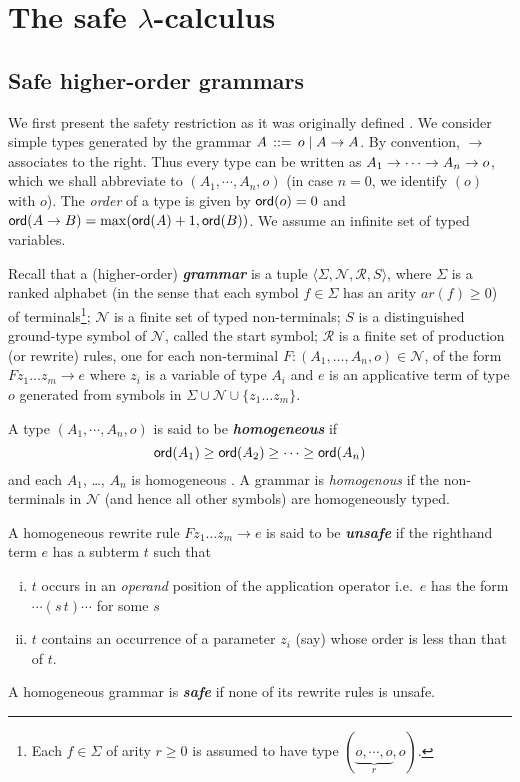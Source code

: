 \documentclass{llncs}
\newcommand\defname[1]{{\bf\em #1}\index{#1}}
\newcommand\union{\cup}
\begin{document}
\section{The safe $\lambda$-calculus}

\subsection{Safe higher-order grammars}
We first present the safety restriction as it was originally defined
\cite{KNU02}. We consider simple types generated by the grammar $A \,
::= \, o \; | \; A \rightarrow A$. By convention, $\rightarrow$ associates
to the right. Thus every type can be written as $A_1 \rightarrow \cdots
\rightarrow A_n \rightarrow o$, which we shall abbreviate to $(A_1, \cdots,
A_n, o)$ (in case $n = 0$, we identify $(o)$ with $o$). The
\emph{order} of a type is given by ${\sf ord}(o) = 0$ and ${\sf ord}(A \rightarrow
  B) = \max({\sf ord}(A)+1, {\sf ord}(B))$. We assume an infinite set of typed
variables.

Recall that a (higher-order) \defname{grammar} is a tuple $\langle
\Sigma, \mathcal{N}, \mathcal{R}, S \rangle$, where $\Sigma$ is a
ranked alphabet (in the sense that each symbol $f \in \Sigma$ has an
arity $\mathit{ar}(f) \geq 0$) of terminals\footnote{Each $f \in
  \Sigma$ of arity $r \geq 0$ is assumed to have type $(\underbrace{o,
    \cdots, o}_r, o)$.}; $\mathcal{N}$ is a finite set of typed
non-terminals; $S$ is a distinguished ground-type symbol of
$\mathcal{N}$, called the start symbol; $\mathcal{R}$ is a finite set
of production (or rewrite) rules, one for each non-terminal $F : (A_1,
\ldots, A_n, o) \in \mathcal{N}$, of the form $ F z_1 \ldots z_m
\rightarrow e$ where $z_i$ is a variable of type $A_i$ and $e$ is an
applicative term of type $o$ generated from symbols in $\Sigma \union
\mathcal{N} \union \{z_1 \ldots z_m \}$.

A type $(A_1, \cdots, A_n, o)$ is said to be \defname{homogeneous} if
\[{\sf ord}(A_1) \geq {\sf ord}(A_2)\geq \cdots \geq {\sf ord}(A_n)\] and each $A_1$,
\ldots, $A_n$ is homogeneous \cite{KNU02}.  A grammar is
\emph{homogenous} if the non-terminals in $\mathcal{N}$ (and hence all
other symbols) are homogeneously typed.

\begin{definition}\rm
  A homogeneous rewrite rule $F z_1 \ldots z_m \rightarrow e$ is said
  to be \defname{unsafe} if the righthand term $e$ has a subterm $t$
  such that
\begin{enumerate}[(i)]
\item $t$ occurs in an \emph{operand} position of the application
  operator i.e.~$e$ has the form $\cdots (s \, t) \cdots $ for some
  $s$
\item $t$ contains an occurrence of a parameter $z_i$ (say) whose
  order is less than that of $t$.
\end{enumerate}
A homogeneous grammar is \defname{safe} if none of its rewrite rules
is unsafe.
\end{definition}
\end{document}
